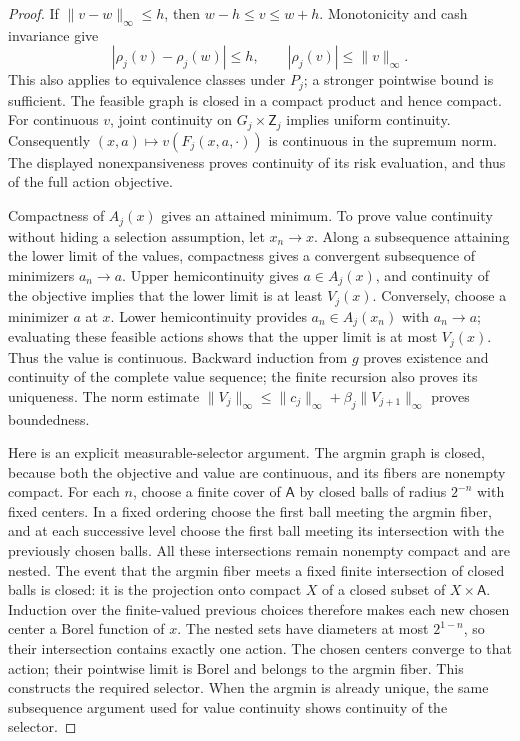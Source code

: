 \begin{proof}
If $\|v-w\|_\infty\le h$, then $w-h\le v\le w+h$.
Monotonicity and cash invariance give
\[
 |\rho_j(v)-\rho_j(w)|\le h,
 \qquad |\rho_j(v)|\le\|v\|_\infty.
\]
This also applies to equivalence classes under $P_j$; a stronger
pointwise bound is sufficient.  The feasible graph is closed in a
compact product and hence compact.  For continuous $v$, joint
continuity on $G_j\times\mathsf Z_j$ implies uniform continuity.
Consequently $(x,a)\mapsto v(F_j(x,a,\cdot))$ is continuous in
the supremum norm.  The displayed nonexpansiveness proves continuity
of its risk evaluation, and thus of the full action objective.

Compactness of $A_j(x)$ gives an attained minimum.  To prove value
continuity without hiding a selection assumption, let $x_n\to x$.
Along a subsequence attaining the lower limit of the values, compactness
gives a convergent subsequence of minimizers $a_n\to a$.
Upper hemicontinuity gives $a\in A_j(x)$, and continuity of the
objective implies that the lower limit is at least $V_j(x)$.
Conversely, choose a minimizer $a$ at $x$.  Lower hemicontinuity
provides $a_n\in A_j(x_n)$ with $a_n\to a$; evaluating these
feasible actions shows that the upper limit is at most $V_j(x)$.
Thus the value is continuous.  Backward induction from $g$ proves
existence and continuity of the complete value sequence; the finite
recursion also proves its uniqueness.  The norm estimate
$\|V_j\|_\infty\le\|c_j\|_\infty+
\beta_j\|V_{j+1}\|_\infty$ proves boundedness.

Here is an explicit measurable-selector argument.  The argmin graph
is closed, because both the objective and value are continuous, and
its fibers are nonempty compact.  For each $n$, choose a finite cover
of $\mathsf A$ by closed balls of radius $2^{-n}$ with fixed
centers.  In a fixed ordering choose the first ball meeting the argmin
fiber, and at each successive level choose the first ball meeting its
intersection with the previously chosen balls.  All these intersections
remain nonempty compact and are nested.  The event that the argmin
fiber meets a fixed finite intersection of closed balls is closed:
it is the projection onto compact $X$ of a closed subset of
$X\times\mathsf A$.  Induction over the finite-valued previous
choices therefore makes each new chosen center a Borel function of
$x$.  The nested sets have diameters at most $2^{1-n}$, so their
intersection contains exactly one action.  The chosen centers converge
to that action; their pointwise limit is Borel and belongs to the
argmin fiber.  This constructs the required selector.  When the
argmin is already unique, the same subsequence argument used for
value continuity shows continuity of the selector.


\end{proof}
